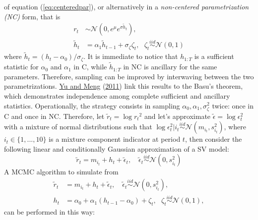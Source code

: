 \documentclass[
  12pt,
]{book}
\theoremstyle{break}
\theoremstyle{nonumberplain}
\begin{document}
of equation (\ref{eq:centeredpar}), or alternatively in a
\emph{non-centered parametrization (NC)} form, that is \begin{equation}
   \begin{aligned}\label{eq:centeredparr}
r_{t} & \sim \mathcal{N}(0,e^{\mu}e^{\sigma \tilde{h}_{t}}),\\
\tilde{h}_{t} & =\alpha_{1}\tilde{h}_{t-1}+\sigma_{\zeta}\zeta_{t}, \ \ \ \zeta_{t}\overset{iid}{\sim}\mathcal{N}(0,1)
\end{aligned}
\end{equation} where
\(\tilde{h}_{t}=(h_{t}-\alpha_{0})/\sigma_{\zeta}\). It is immediate to
notice that \(h_{1:T}\) is a sufficient statistic for \(\alpha_0\) and
\(\alpha_1\) in C, while \(\tilde{h}_{1:T}\) in NC is ancillary for the
same parameters. Therefore, sampling can be improved by interwaving
between the two parametrizations. \protect\hyperlink{ref-YM_2011}{Yu and
Meng} (\protect\hyperlink{ref-YM_2011}{2011}) link this results to the
Basu's theorem, which demonstrates independence among complete
sufficient and ancillary statistics. Operationally, the strategy
consists in sampling \(\alpha_{0},\alpha_{1},\sigma^{2}_{\zeta}\) twice:
once in C and once in NC. Therefore, let
\(\tilde{r}_{t}=\log{r_{t}}^{2}\) and let's approximate
\(\tilde{\epsilon}=\log\epsilon^{2}_{t}\) with a mixture of normal
distributions such that
\(\log\epsilon^{2}_{t}|i_{t}\overset{iid}{\sim}\mathcal{N}(m_{i_t},s_{i_t}^{2})\),
where \(i_{t} \in \{1,...,10\}\) is a mixture component indicator at
period \(t\), then consider the following linear and conditionally
Gaussian approximation of a SV model: \[
\tilde{r}_{t} = m_{i_t}+h_{t}+\tilde{\epsilon}_t, \quad \tilde{\epsilon}_{t}\overset{iid}{\sim}\mathcal{N}(0,s_{i_t}^2)
\] A MCMC algorithm to simulate from \begin{align*}
\tilde{r}_{t} & =  m_{i_t}+h_{t}+\tilde{\epsilon}_t, \quad \tilde{\epsilon}_{t}\overset{iid}{\sim}\mathcal{N}(0,s_{i_t}^2),\\
h_{t} & = \alpha_{0}+\alpha_{1}(h_{t-1}-\alpha_0)+\zeta_{t}, \ \ \ \zeta_{t}\overset{iid}{\sim}\mathcal{N}(0,1),
\end{align*} can be performed in this way:
\end{document}
